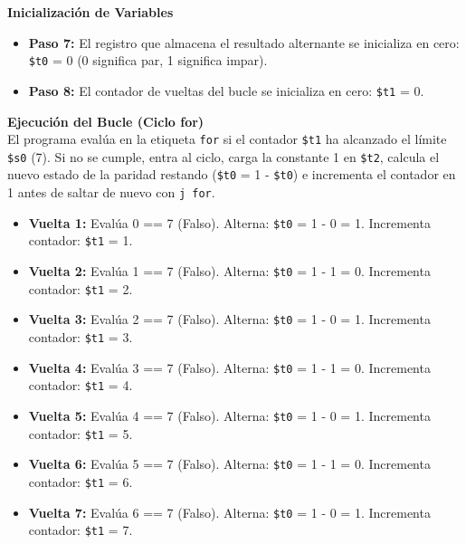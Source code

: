 \documentclass[12pt,a4paper]{article}
\begin{document}
\textbf{Inicialización de Variables}
\begin{itemize}
    \item \textbf{Paso 7:} El registro que almacena el resultado alternante se inicializa en cero: \texttt{\$t0} = 0 (0 significa par, 1 significa impar).
    \item \textbf{Paso 8:} El contador de vueltas del bucle se inicializa en cero: \texttt{\$t1} = 0.
\end{itemize}

\textbf{Ejecución del Bucle (Ciclo for)} \\
El programa evalúa en la etiqueta \texttt{for} si el contador \texttt{\$t1} ha alcanzado el límite \texttt{\$s0} (7). Si no se cumple, entra al ciclo, carga la constante 1 en \texttt{\$t2}, calcula el nuevo estado de la paridad restando (\texttt{\$t0} = 1 - \texttt{\$t0}) e incrementa el contador en 1 antes de saltar de nuevo con \texttt{j for}.

\begin{itemize}
    \item \textbf{Vuelta 1:} Evalúa 0 == 7 (Falso). Alterna: \texttt{\$t0} = 1 - 0 = 1. Incrementa contador: \texttt{\$t1} = 1.
    \item \textbf{Vuelta 2:} Evalúa 1 == 7 (Falso). Alterna: \texttt{\$t0} = 1 - 1 = 0. Incrementa contador: \texttt{\$t1} = 2.
    \item \textbf{Vuelta 3:} Evalúa 2 == 7 (Falso). Alterna: \texttt{\$t0} = 1 - 0 = 1. Incrementa contador: \texttt{\$t1} = 3.
    \item \textbf{Vuelta 4:} Evalúa 3 == 7 (Falso). Alterna: \texttt{\$t0} = 1 - 1 = 0. Incrementa contador: \texttt{\$t1} = 4.
    \item \textbf{Vuelta 5:} Evalúa 4 == 7 (Falso). Alterna: \texttt{\$t0} = 1 - 0 = 1. Incrementa contador: \texttt{\$t1} = 5.
    \item \textbf{Vuelta 6:} Evalúa 5 == 7 (Falso). Alterna: \texttt{\$t0} = 1 - 1 = 0. Incrementa contador: \texttt{\$t1} = 6.
    \item \textbf{Vuelta 7:} Evalúa 6 == 7 (Falso). Alterna: \texttt{\$t0} = 1 - 0 = 1. Incrementa contador: \texttt{\$t1} = 7.
\end{itemize}
\end{document}
